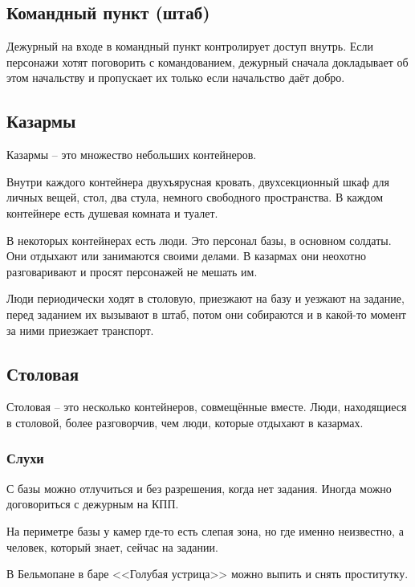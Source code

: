 \documentclass{article}
\begin{document}
\subsection{Командный пункт
(штаб)}\label{command-post}

Дежурный на входе в командный пункт контролирует доступ внутрь. Если
персонажи хотят поговорить с командованием, дежурный сначала докладывает
об этом начальству и пропускает их только если начальство даёт добро.

\subsection{Казармы}\label{base-barracks}

Казармы -- это множество небольших контейнеров.

Внутри каждого контейнера двухъярусная кровать, двухсекционный шкаф для
личных вещей, стол, два стула, немного свободного пространства. В каждом
контейнере есть душевая комната и туалет.

В некоторых контейнерах есть люди. Это персонал базы, в основном
солдаты. Они отдыхают или занимаются своими делами. В казармах они
неохотно разговаривают и просят персонажей не мешать им.

Люди периодически ходят в столовую, приезжают на базу и уезжают на
задание, перед заданием их вызывают в штаб, потом они собираются и в
какой-то момент за ними приезжает транспорт.

\subsection{Столовая}\label{base-mess}

Столовая -- это несколько контейнеров, совмещённые вместе. Люди,
находящиеся в столовой, более разговорчив, чем люди, которые отдыхают в
казармах.

\subsubsection{Слухи}\label{rumors}

С базы можно отлучиться и без разрешения, когда нет задания. Иногда
можно договориться с дежурным на КПП.

На периметре базы у камер где-то есть слепая зона, но где именно
неизвестно, а человек, который знает, сейчас на задании.

В Бельмопане в баре <<Голубая устрица>> можно выпить и снять проститутку.
\end{document}

